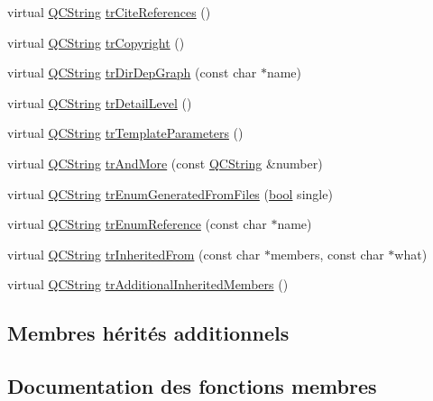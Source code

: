 \begin{DoxyCompactItemize}
\item 
virtual \hyperlink{class_q_c_string}{Q\+C\+String} \hyperlink{class_translator_croatian_ac1c1497f155e733a23d30ce572300759}{tr\+Cite\+References} ()
\item 
virtual \hyperlink{class_q_c_string}{Q\+C\+String} \hyperlink{class_translator_croatian_a3551539c8ac3b746f1c771870b984587}{tr\+Copyright} ()
\item 
virtual \hyperlink{class_q_c_string}{Q\+C\+String} \hyperlink{class_translator_croatian_a96c6dffa8db6ee66e1fda8234d78f3de}{tr\+Dir\+Dep\+Graph} (const char $\ast$name)
\item 
virtual \hyperlink{class_q_c_string}{Q\+C\+String} \hyperlink{class_translator_croatian_a8c51d43d261f6bdac4ad89305a51439e}{tr\+Detail\+Level} ()
\item 
virtual \hyperlink{class_q_c_string}{Q\+C\+String} \hyperlink{class_translator_croatian_aeab4867516f03a2920bb07afa909403b}{tr\+Template\+Parameters} ()
\item 
virtual \hyperlink{class_q_c_string}{Q\+C\+String} \hyperlink{class_translator_croatian_aef0e197da4aafbb941a5ba5a43ebcd21}{tr\+And\+More} (const \hyperlink{class_q_c_string}{Q\+C\+String} \&number)
\item 
virtual \hyperlink{class_q_c_string}{Q\+C\+String} \hyperlink{class_translator_croatian_a48747300f884a8e745a45eebb4b70a20}{tr\+Enum\+Generated\+From\+Files} (\hyperlink{qglobal_8h_a1062901a7428fdd9c7f180f5e01ea056}{bool} single)
\item 
virtual \hyperlink{class_q_c_string}{Q\+C\+String} \hyperlink{class_translator_croatian_a60cdeaebbcd43e0042ccd1daf99b50fc}{tr\+Enum\+Reference} (const char $\ast$name)
\item 
virtual \hyperlink{class_q_c_string}{Q\+C\+String} \hyperlink{class_translator_croatian_a6276e8ba64d64b3112350b3266341cf4}{tr\+Inherited\+From} (const char $\ast$members, const char $\ast$what)
\item 
virtual \hyperlink{class_q_c_string}{Q\+C\+String} \hyperlink{class_translator_croatian_af21178f49ef1c7763b9505365cc95510}{tr\+Additional\+Inherited\+Members} ()
\end{DoxyCompactItemize}
\subsection*{Membres hérités additionnels}


\subsection{Documentation des fonctions membres}
\hypertarget{class_translator_croatian_a7523d1409b7194459972bcdd86aeec53}{}
